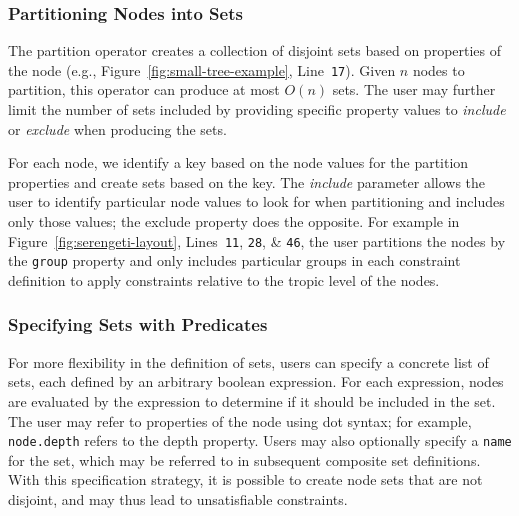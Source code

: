 \subsubsection{Partitioning Nodes into Sets}
The partition operator creates a collection of disjoint sets based on
properties of the node
(e.g., Figure~\ref{fig:small-tree-example}, Line~\texttt{17}).
Given $n$ nodes to partition, this operator can produce at most $O(n)$ 
sets. The user may further limit 
the number of sets included by providing specific property values to 
\emph{include} or \emph{exclude} when producing the sets.

For each node, we identify a key based on the node values for the partition
properties and create sets based on the key. The \emph{include} parameter allows
the user to identify particular node values to look for when partitioning
and includes only those values; the exclude property does the opposite. 
For example in Figure~\ref{fig:serengeti-layout}, Lines~\texttt{11}, \texttt{28},
\& \texttt{46}, the user partitions the nodes by the \texttt{group} property
and only includes particular groups in each constraint definition to apply
constraints relative to the tropic level of the nodes.

\subsubsection{Specifying Sets with Predicates}
For more flexibility in the definition of sets, users
can specify a concrete list of sets, each defined by an arbitrary boolean
expression. For each expression, nodes are evaluated by the expression
to determine if it should be included in the set. The user may
refer to properties of the node using dot syntax; for example,
\texttt{node.depth} refers to the depth property. Users may also optionally 
specify a \texttt{name} for the set, which may be referred to in subsequent
composite set definitions. With this specification strategy, it is possible
to create node sets that are not disjoint, and may thus lead to
unsatisfiable constraints.

